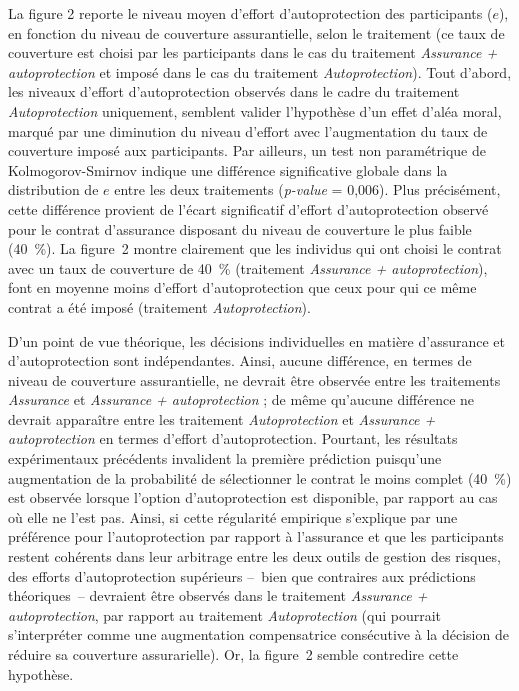 \begin{Article}
\begin{refsection}[Mouminoux]
La figure 2 reporte le niveau moyen d'effort d'autoprotection des participants ($e$), en fonction du niveau de couverture assurantielle, selon le traitement (ce taux de couverture est choisi par les participants dans le cas du traitement \textit{Assurance + autoprotection} et imposé dans le cas du traitement \textit{Autoprotection}). Tout d'abord, les niveaux d'effort d'autoprotection observés dans le cadre du traitement \textit{Autoprotection} uniquement, semblent valider l'hypothèse d'un effet d'aléa moral, marqué par une diminution du niveau d'effort avec l'augmentation du taux de couverture imposé aux participants. Par ailleurs, un test non paramétrique de Kolmogorov-Smirnov indique une différence significative globale dans la distribution de $e$ entre les deux traitements (\textit{p-value} = 0,006). Plus précisément, cette différence provient de l'écart significatif d'effort d'autoprotection observé pour le contrat d'assurance disposant du niveau de couverture le plus faible (40~\%). La figure~2 montre clairement que les individus qui ont choisi le contrat avec un taux de couverture de 40~\% (traitement \textit{Assurance + autoprotection}), font en moyenne moins d'effort d'autoprotection que ceux pour qui ce même contrat a été imposé (traitement \textit{Autoprotection}).
 
D’un point de vue théorique, les décisions individuelles en matière d’assurance et d’autoprotection sont indépendantes. Ainsi, aucune différence, en termes de niveau de couverture assurantielle, ne devrait être observée entre les traitements\textit{ Assurance} et \textit{Assurance + autoprotection} ; de même qu’aucune différence ne devrait apparaître entre les traitement \textit{Autoprotection} et \textit{Assurance + autoprotection} en termes d’effort d’autoprotection. Pourtant, les résultats expérimentaux précédents invalident la première prédiction puisqu'une augmentation de la probabilité de sélectionner le contrat le moins complet (40~\%) est observée lorsque l'option d'autoprotection est disponible, par rapport au cas où elle ne l'est pas. Ainsi, si cette régularité empirique s’explique par une préférence pour l’autoprotection par rapport à l’assurance et que les participants restent cohérents dans leur arbitrage entre les deux outils de gestion des risques, des efforts d’autoprotection supérieurs --~bien que contraires aux prédictions théoriques~-- devraient être observés dans le traitement \textit{Assurance + autoprotection}, par rapport au traitement \textit{Autoprotection} (qui pourrait s'interpréter comme  une augmentation compensatrice consécutive à la décision de réduire sa couverture assurarielle). Or, la figure~2 semble contredire cette hypothèse.


\end{refsection}
\end{Article}
